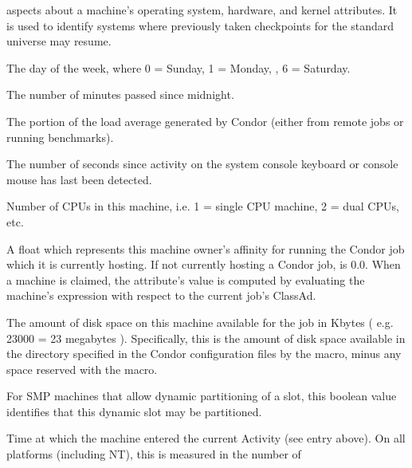 \begin{description}
aspects about a machine's operating system, hardware, and kernel
attributes.
It is used to identify systems where previously taken checkpoints for
the standard universe may resume.
%
\item[\AdAttr{ClockDay}:] The day of the week, where 0 = Sunday, 1 = Monday, \Dots, 6 = Saturday. 
%
\item[\AdAttr{ClockMin}:] The number of minutes passed since midnight.
%
\item[\AdAttr{CondorLoadAvg}:] The portion of the load average generated by Condor (either
from remote jobs or running benchmarks).
%
\item[\AdAttr{ConsoleIdle}:] The number of seconds since activity on the system
console keyboard or console mouse has last been detected.
%
\item[\AdAttr{Cpus}:] Number of CPUs in this machine, i.e. 1 = single CPU machine, 2 = dual
CPUs, etc.
%
\item[\AdAttr{CurrentRank}:] A float which represents this machine
owner's affinity
for running the Condor job which it is currently hosting.  If not
currently hosting a Condor job,  is 0.0.
When a machine is claimed,
the attribute's value is computed by evaluating the machine's
 expression with respect to the current job's ClassAd.
%
\item[\AdAttr{Disk}:] The amount of disk space on this machine available for
the job in Kbytes ( e.g. 23000 = 23 megabytes ).  Specifically, this
is the amount of disk space available in the directory specified in
the Condor configuration files by the  macro, minus any
space reserved with the  macro.
%
\label{DynamicSlot-machine-attribute} 
\item[\AdAttr{DynamicSlot}:] For SMP machines that allow dynamic
partitioning of a slot,
this boolean value identifies that this dynamic slot may be partitioned.
%
\item[\AdAttr{EnteredCurrentActivity}:] Time at which the machine
entered the current Activity (see  entry above).  On
all platforms (including NT), this is measured in the number of

\end{description}
